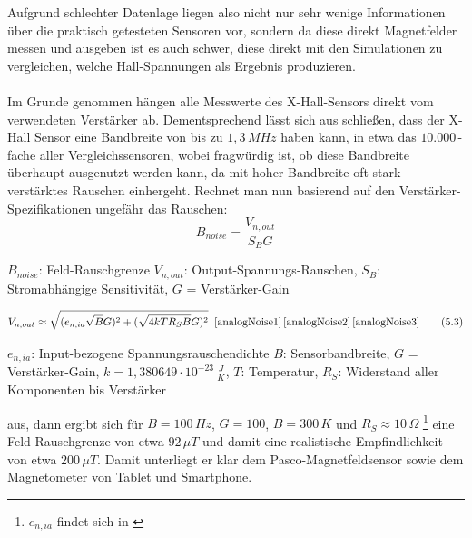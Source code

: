 \documentclass[12pt, a4paper]{article}
\renewcommand{\footnotesize}{\fontsize{10pt}{12pt}\selectfont}
\begin{document}
Aufgrund schlechter Datenlage liegen also nicht nur sehr wenige Informationen über die praktisch getesteten Sensoren vor, sondern da diese direkt Magnetfelder messen und ausgeben ist es auch schwer, diese direkt mit den Simulationen zu vergleichen, welche Hall-Spannungen als Ergebnis produzieren.\paragraph{}
Im Grunde genommen hängen alle Messwerte des X-Hall-Sensors direkt vom verwendeten Verstärker ab.\newline
Dementsprechend lässt sich aus \cite{texInsAmp} schließen, dass der X-Hall Sensor eine Bandbreite von bis zu $1,3\,MHz$ haben kann, in etwa das $10.000\,$-fache aller Vergleichssensoren, wobei fragwürdig ist, ob diese Bandbreite überhaupt ausgenutzt werden kann, da mit hoher Bandbreite oft stark verstärktes Rauschen einhergeht.\newline
Rechnet man nun basierend auf den Verstärker-Spezifikationen ungefähr das Rauschen:
\begin{equation}
	B_{noise}=\frac{V_{n,out}}{S_BG}
	\tag{5.2}
	\label{5.2}
\end{equation}

\vspace{-0.8em}
\begin{center}
	\footnotesize
	$B_{noise}$: Feld-Rauschgrenze $V_{n,out}$: Output-Spannungs-Rauschen, $S_B$: Stromabhängige Sensitivität, \newline
	$G$ = Verstärker-Gain
\end{center}

\begin{equation}
	V_{n,out}\approx\sqrt{(e_{n,ia}\sqrt{B}G)^2+(\sqrt{4kTR_SB}G)^2}\;\;\cite{analogNoise1}\,\cite{analogNoise2}\,\cite{analogNoise3}
	\tag{5.3}
	\label{5.3}
\end{equation}

\vspace{-0.8em}
\begin{center}
	\footnotesize
	$e_{n,ia}$: Input-bezogene Spannungsrauschendichte $B$: Sensorbandbreite, $G$ = Verstärker-Gain, $k=1,380649\cdot10^{-23}\,\frac{J}{K}$, $T$: Temperatur, $R_S$: Widerstand aller Komponenten bis Verstärker
\end{center}
aus, dann ergibt sich für $B=100\,Hz$, $G=100$, $B=300\,K$ und $R_S\approx10\,\Omega$ \footnote{$e_{n,ia}$ findet sich in \cite{texInsAmp}} eine Feld-Rauschgrenze von etwa $92\,\mu{T}$ und damit eine realistische Empfindlichkeit von etwa $200\,\mu{T}$.
Damit unterliegt er klar dem Pasco-Magnetfeldsensor sowie dem Magnetometer von Tablet und Smartphone.
\end{document}
